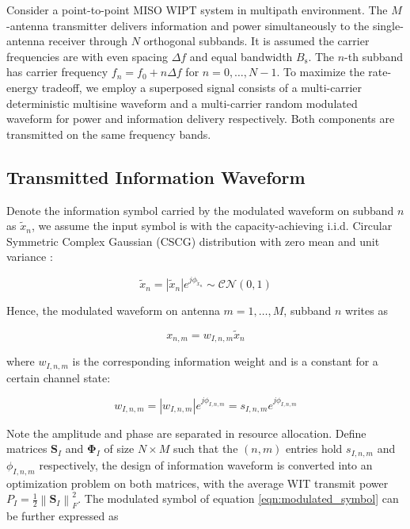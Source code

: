 Consider a point-to-point MISO WIPT system in multipath environment. The $M$-antenna transmitter delivers information and power simultaneously to the single-antenna receiver through $N$ orthogonal subbands. It is assumed the carrier frequencies are with even spacing $\Delta f$ and equal bandwidth ${B_{\text{s}}}$. The $n$-th subband has carrier frequency ${f_n} = {f_0} + n\Delta f$ for $n = 0, \ldots ,N - 1$. To maximize the rate-energy tradeoff, we employ a superposed signal consists of a multi-carrier deterministic multisine waveform and a multi-carrier random modulated waveform for power and information delivery respectively. Both components are transmitted on the same frequency bands.

\subsection{Transmitted Information Waveform}
Denote the information symbol carried by the modulated waveform on subband $n$ as ${{\tilde x}_n}$, we assume the input symbol is with the capacity-achieving i.i.d. Circular Symmetric Complex Gaussian (CSCG) distribution with zero mean and unit variance \cite{Varasteh2017a}:

\begin{equation}\label{eqn:unmodulated_symbol}
  {{\tilde x}_n} = \left| {{{\tilde x}_n}} \right|{e^{j{\phi _{{{\tilde x}_n}}}}}\sim\mathcal{C}\mathcal{N}(0,1)
\end{equation}

Hence, the modulated waveform on antenna $m = 1, \ldots ,M$, subband $n$ writes as

\begin{equation}\label{eqn:modulated_symbol}
  {x_{n,m}} = {w_{I,n,m}}{{\tilde x}_n}
\end{equation}

where ${w_{I,n,m}}$ is the corresponding information weight and is a constant for a certain channel state:

\begin{equation}\label{eqn:weight_information}
  {w_{I,n,m}} = \left| {{w_{I,n,m}}} \right|{e^{j{\phi _{I,n,m}}}} = {s_{I,n,m}}{e^{j{\phi _{I,n,m}}}}
\end{equation}

Note the amplitude and phase are separated in resource allocation. Define matrices ${{\mathbf{S}}_I}$ and ${{\mathbf{\Phi }}_I}$ of size $N \times M$ such that the $(n,m)$ entries hold ${s_{I,n,m}}$ and ${\phi _{I,n,m}}$ respectively, the design of information waveform is converted into an optimization problem on both matrices, with the average WIT transmit power ${P_I} = \frac{1}{2}\left\| {{{\mathbf{S}}_I}} \right\|_F^2$. The modulated symbol of equation \ref{eqn:modulated_symbol} can be further expressed as

